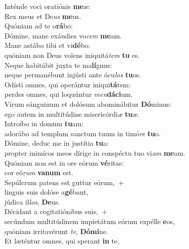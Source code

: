 \evenverse Inténde voci oratiónis \textbf{me}æ:~\*\\
\evenverse Rex meus et De\textit{us} \textbf{me}us.\\
\oddverse Quóniam ad te o\textbf{rá}bo:~\*\\
\oddverse Dómine, mane exáudies vo\textit{cem} \textbf{me}am.\\
\evenverse Mane astábo tibi et vi\textbf{dé}bo:~\*\\
\evenverse quóniam non Deus volens iniquitá\textit{tem} \textbf{tu} es.\\
\oddverse Neque habitábit juxta te ma\textbf{lí}gnus:~\*\\
\oddverse neque permanébunt injústi ante ócu\textit{los} \textbf{tu}os.\\
\evenverse Odísti omnes, qui operántur iniqui\textbf{tá}tem:~\*\\
\evenverse perdes omnes, qui loquúntur \textit{men}\textbf{dá}\textbf{ci}um.\\
\oddverse Virum sánguinum et dolósum abominábitur \textbf{Dó}minus:~\*\\
\oddverse ego autem in multitúdine misericórdi\textit{æ} \textbf{tu}æ.\\
\evenverse Introíbo in domum \textbf{tu}am:~\*\\
\evenverse adorábo ad templum sanctum tuum in timó\textit{re} \textbf{tu}o.\\
\oddverse Dómine, deduc me in justítia \textbf{tu}a:~\*\\
\oddverse propter inimícos meos dírige in conspéctu tuo vi\textit{am} \textbf{me}am.\\
\evenverse Quóniam non est in ore eórum \textbf{vé}ritas:~\*\\
\evenverse cor eó\textit{rum} \textbf{va}\textbf{num} est.\\
\oddverse Sepúlcrum patens est guttur eórum,~+\\
\oddverse  linguis suis dolóse a\textbf{gé}bant,~\*\\
\oddverse júdica il\textit{los}, \textbf{De}us.\\
\evenverse Décidant a cogitatiónibus suis,~+\\
\evenverse  secúndum multitúdinem impietátum eórum expélle \textbf{e}os,~\*\\
\evenverse quóniam irritavérunt \textit{te}, \textbf{Dó}\textbf{mi}ne.\\
\oddverse Et læténtur omnes, qui sperant \textbf{in} te,~\*\\
